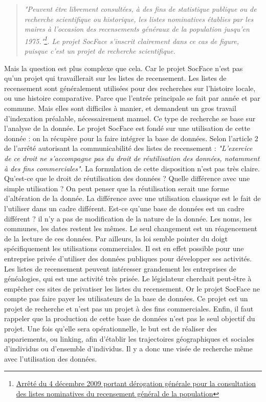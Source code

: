 \begin{quote}
    \textit{"Peuvent être librement consultées, à des fins de statistique publique ou de recherche scientifique ou historique, les listes nominatives établies par les maires à l'occasion des recensements généraux de la population jusqu'en 1975."\footnote{\href{https://www.legifrance.gouv.fr/jorf/id/JORFTEXT000021467019}{Arrêté du 4 décembre 2009 portant dérogation générale pour la consultation des listes nominatives du recensement général de la population}}. Le projet SocFace s’inscrit clairement dans ce cas de figure, puisque c’est un projet de recherche scientifique.}
\end{quote}

Mais la question est plus complexe que cela. Car le projet SocFace n’est pas qu’un projet qui travaillerait sur les listes de recensement. Les listes de recensement sont généralement utilisées pour des recherches sur l’histoire locale, ou une histoire comparative. Parce que l’entrée principale se fait par année et par commune. Mais elles sont difficiles à manier, et demandent un gros travail d’indexation préalable, nécessairement manuel. Ce type de recherche se base sur l’analyse de la donnée. Le projet SocFace est fondé sur une utilisation de cette donnée : on la récupère pour la faire intégrer la base de données. Selon l’article 2 de l’arrêté autorisant la communicabilité des listes de recensement : \textit{"L’exercice de ce droit ne s’accompagne pas du droit de réutilisation des données, notamment à des fins commerciales"}. La formulation de cette disposition n’est pas très claire. Qu’est-ce que le droit de réutilisation des données ? Quelle différence avec une simple utilisation ? On peut penser que la réutilisation serait une forme d’altération de la donnée. La différence avec une utilisation classique est le fait de l’utiliser dans un cadre différent. Est-ce qu’une base de données est un cadre différent ? il n’y a pas de modification de la nature de la donnée. Les noms, les communes, les dates restent les mêmes. Le seul changement est un réagencement de la lecture de ces données. Par ailleurs, la loi semble pointer du doigt spécifiquement les utilisations commerciales. Il est en effet possible pour une entreprise privée d’utiliser des données publiques pour développer ses activités. Les listes de recensement peuvent intéresser grandement les entreprises de généalogies, qui est une activité très prisée. Le législateur cherchait peut-être à empêcher ces sites de privatiser les listes du recensement. Or le projet SocFace ne compte pas faire payer les utilisateurs de la base de données. Ce projet est un projet de recherche et n’est pas un projet à des fins commerciales. Enfin, il faut rappeler que la production de cette base de données n’est pas le seul objectif du projet. Une fois qu’elle sera opérationnelle, le but est de réaliser des appariements, ou linking, afin d’établir les trajectoires géographiques et sociales d’individus ou d’ensemble d’individus. Il y a donc une visée de recherche même avec l’utilisation des données.\\
